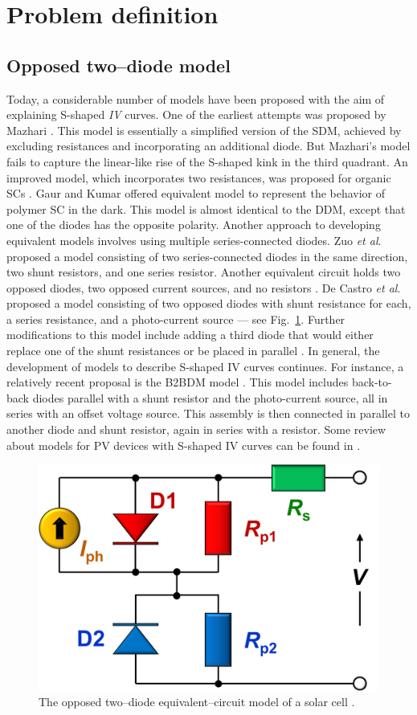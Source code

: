 \documentclass[a4paper,fleqn]{cas-sc}
\begin{document}
\section{Problem definition}\label{MM}
\subsection{Opposed two--diode model}\label{SCModel}

Today, a considerable number of models have been proposed with the aim of explaining S-shaped \emph{IV} curves.
One of the earliest attempts was proposed by Mazhari \cite{Mazhari2006}.
This model is essentially a simplified version of the SDM, achieved by excluding resistances and incorporating an additional diode.
But Mazhari's model fails to capture the linear-like rise of the S-shaped kink in the third quadrant.
An improved model, which incorporates two resistances, was proposed for organic SCs \cite{Yu2019}.
Gaur and Kumar \cite{Gaur2014} offered equivalent model to represent the behavior of polymer SC in the dark.
This model is almost identical to the DDM, except that one of the diodes has the opposite polarity.
Another approach to developing equivalent models involves using multiple series-connected diodes.
Zuo \emph{et al}. \cite{Zuo2014} proposed a model consisting of two series-connected diodes in the same direction,
two shunt resistors, and one series resistor.
Another equivalent circuit holds two opposed diodes, two opposed current sources, and no resistors \cite{Gao2011}.
De Castro \emph{et al}. \cite{Castro2010} proposed a model consisting of two opposed diodes with shunt resistance for each,
a series resistance, and a photo-current source --- see Fig.~\ref{fig_chem}.
Further modifications to this model include adding a third diode
that would either replace one of the shunt resistances \cite{GarciaSanchez2013}
or be placed in parallel \cite{DeCastro2016,Roland2016}.
In general, the development of models to describe S-shaped IV curves continues.
For instance, a relatively recent proposal is the B2BDM model \cite{Sesa2019}.
This model includes back-to-back diodes parallel
with a shunt resistor and the photo-current source, all in series with an offset voltage source.
This assembly is then connected in parallel to another diode and shunt resistor, again in series with a resistor.
Some review about models for PV devices with S-shaped IV curves can be found in \cite{SshapeRewShot,GarciaSanchez2017}.

\begin{figure}[]
	\centering
		\includegraphics[width=0.35\columnwidth]{Fig1}
	  \caption{The opposed two--diode equivalent--circuit model of a solar cell  \cite{Castro2010}.}\label{fig_chem}
\end{figure}
\end{document}
